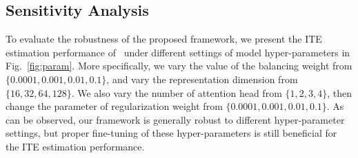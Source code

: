 \vspace{-1mm}
\subsection{Sensitivity Analysis}

To evaluate the robustness of the proposed framework, we present the ITE estimation performance of \mymodel~under different settings of model hyper-parameters in Fig.~\ref{fig:param}. More specifically, we vary the value of the balancing weight from $\{0.0001,0.001,0.01,0.1\}$, and vary the representation dimension from $\{16, 32, 64, 128\}$. We also vary the number of attention head from $\{1,2,3,4\}$, then change the parameter of regularization weight from $\{0.0001, 0.001, 0.01, 0.1\}$.
As can be observed, our framework is generally robust to different hyper-parameter settings, but proper fine-tuning of these hyper-parameters is still beneficial for the ITE estimation performance. %








